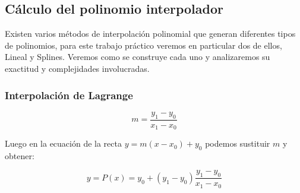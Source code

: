 



\subsection{Cálculo del polinomio interpolador}

Existen varios métodos de interpolación polinomial que generan diferentes tipos de polinomios, para este trabajo práctico veremos en particular dos de ellos, Lineal y Splines. Veremos como se construye cada uno y analizaremos su exactitud y complejidades involucradas.

\subsubsection{Interpolación de Lagrange}


\begin{equation}
	 m = \dfrac{y_1 - y_0}{x_1 - x_0}
\end{equation}

Luego en la ecuación de la recta $y = m(x - x_0) + y_0$ podemos sustituir $m$ y 
obtener:

\begin{equation} \label{eq:lineal}
	 y = P(x) = y_0 + (y_1 - y_0)\dfrac{y_1 - y_0}{x_1 - x_0} 
\end{equation} 

